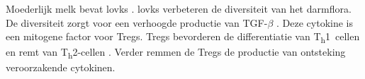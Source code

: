 \documentclass[abstract=true]{scrartcl}
\begin{document}
Moederlijk melk bevat \glspl{lovk} \cite{das2002essential}. \Glspl{lovk} verbeteren de diversiteit van het darmflora. De diversiteit zorgt voor een verhoogde productie van TGF-$\beta$ \cite{das2002essential,Das_2004}. Deze cytokine is een mitogene factor voor Tregs. Tregs bevorderen de differentiatie van T\textsubscript{h}1~cellen en remt van T\textsubscript{h}2-cellen \cite{penttila2010milk}. Verder remmen de Tregs de productie van ontsteking veroorzakende cytokinen. 


\printglossaries
\printbibliography 
\end{document}

